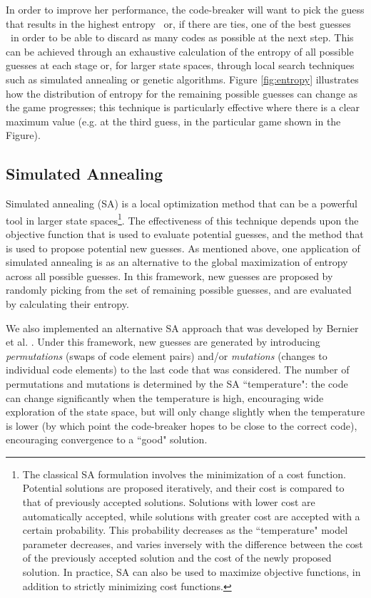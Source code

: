 \documentclass[11pt]{article}
\begin{document}
In order to improve her performance, the code-breaker will want to pick the guess that results in the highest entropy \textendash \ or, if there are ties, one of the best guesses \textendash \ in order to be able to discard as many codes as possible at the next step. This can be achieved through an exhaustive calculation of the entropy of all possible guesses at each stage or, for larger state spaces, through local search techniques such as simulated annealing or genetic algorithms.  Figure \ref{fig:entropy} illustrates how the distribution of entropy for the remaining possible guesses can change as the game progresses; this technique is particularly effective where there is a clear maximum value (e.g. at the third guess, in the particular game shown in the Figure).

\newpage

\subsection{Simulated Annealing}

Simulated annealing (SA) is a local optimization method that can be a powerful tool in larger state spaces\footnote{The classical SA formulation involves the minimization of a cost function. Potential solutions are proposed iteratively, and their cost is compared to that of previously accepted solutions. Solutions with lower cost are automatically accepted, while solutions with greater cost are accepted with a certain probability. This probability decreases as the ``temperature" model parameter decreases, and varies inversely with the difference between the cost of the previously accepted solution and the cost of the newly proposed solution. In practice, SA can also be used to maximize objective functions, in addition to strictly minimizing cost functions.}. The effectiveness of this technique depends upon the objective function that is used to evaluate potential guesses, and the method that is used to propose potential new guesses. As mentioned above, one application of simulated annealing is as an alternative to the global maximization of entropy across all possible guesses. In this framework, new guesses are proposed by randomly picking from the set of remaining possible guesses, and are evaluated by calculating their entropy.

We also implemented an alternative SA approach that was developed by Bernier et al. \cite{bernier1996solving}. Under this framework, new guesses are generated by introducing \textit{permutations} (swaps of code element pairs) and/or \textit{mutations} (changes to individual code elements) to the last code that was considered. The number of permutations and mutations is determined by the SA ``temperature": the code can change significantly when the temperature is high, encouraging wide exploration of the state space, but will only change slightly when the temperature is lower (by which point the code-breaker hopes to be close to the correct code), encouraging convergence to a ``good" solution.
\end{document}
